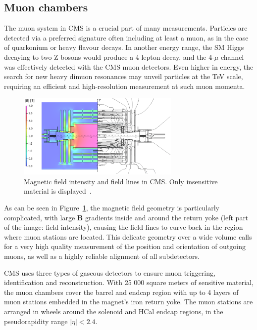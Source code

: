 \subsection{Muon chambers}
\label{sec:muonchambers}

The muon system in CMS is a crucial part of many
measurements. Particles are detected via a preferred signature often
including at least a muon, as in the case of quarkonium or heavy flavour
decays. In another energy range, the SM Higgs decaying to two Z
bosons would produce a 4 lepton decay, and the 4-$\mu$ channel was effectively detected with the CMS muon detectors. Even higher in
energy, the search for new heavy dimuon resonances may unveil
particles at the TeV scale, requiring an efficient and high-resolution
measurement at such muon momenta.

\begin{figure}[htb]
  \begin{center}
    \includegraphics[width=0.7\textwidth]{Chapters/xLHCMS/MagField.png}
    \caption{Magnetic field intensity and field lines in
      CMS. Only insensitive material is displayed~\cite{Chatrchyan:2013sba}.}
    \label{fig:magfield}
  \end{center}
\end{figure}

As can be seen in Figure~\ref{fig:magfield}, the
magnetic field geometry is particularly complicated, with large \textbf{B}
gradients inside and around the return yoke (left part of the image:
field intensity), causing the field lines to curve back in the region
where muon stations are located. This delicate geometry over a wide
volume calls for a very high quality measurement of the position and orientation of outgoing muons, as well as a highly reliable alignment of
all subdetectors.


CMS uses three types of gaseous detectors to ensure muon triggering,
identification and reconstruction. With 25 000 square meters of
sensitive material, the muon chambers cover the barrel and endcap
region with up to 4 layers of muon stations embedded in the magnet's
iron return yoke. 
The muon stations are arranged in wheels around the solenoid and HCal endcap
regions, in the pseudorapidity range $\vert\eta\vert < 2.4$.

